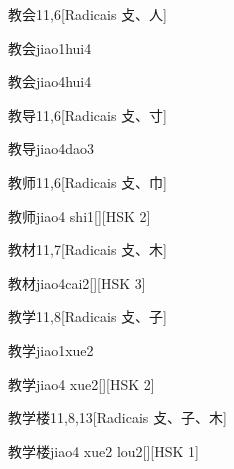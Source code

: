 \begin{entry}{教会}{11,6}[Radicais ⽁、⼈]
  \begin{phonetics}{教会}{jiao1hui4}
  \end{phonetics}
  \begin{phonetics}{教会}{jiao4hui4}
  \end{phonetics}
\end{entry}

\begin{entry}{教导}{11,6}[Radicais ⽁、⼨]
  \begin{phonetics}{教导}{jiao4dao3}
  \end{phonetics}
\end{entry}

\begin{entry}{教师}{11,6}[Radicais ⽁、⼱]
  \begin{phonetics}{教师}{jiao4 shi1}[][HSK 2]
  \end{phonetics}
\end{entry}

\begin{entry}{教材}{11,7}[Radicais ⽁、⽊]
  \begin{phonetics}{教材}{jiao4cai2}[][HSK 3]
  \end{phonetics}
\end{entry}

\begin{entry}{教学}{11,8}[Radicais ⽁、⼦]
  \begin{phonetics}{教学}{jiao1xue2}
  \end{phonetics}
  \begin{phonetics}{教学}{jiao4 xue2}[][HSK 2]
  \end{phonetics}
\end{entry}

\begin{entry}{教学楼}{11,8,13}[Radicais ⽁、⼦、⽊]
  \begin{phonetics}{教学楼}{jiao4 xue2 lou2}[][HSK 1]
  \end{phonetics}
\end{entry}

